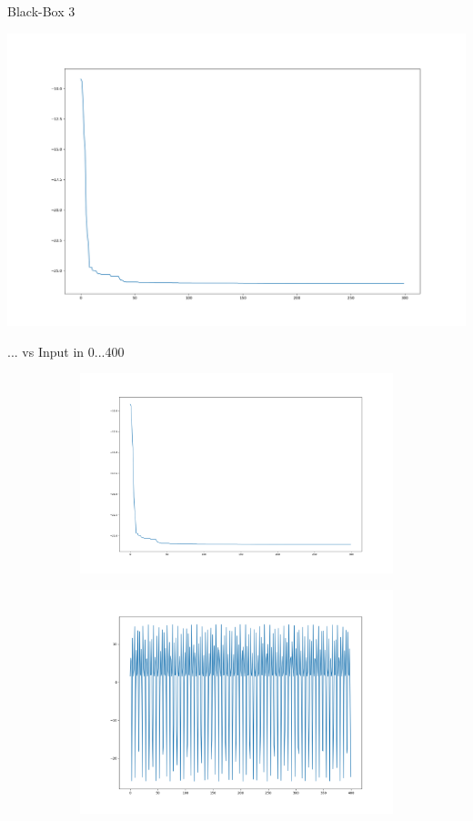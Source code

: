 \documentclass{ocbeameruni}
\begin{document}
\begin{frame}{Black-Box 3}
    \begin{center}
    \includegraphics[scale=0.25]{plots/bb3_2.png}
    \end{center}
\end{frame}


\begin{frame}{... vs Input in 0...400}
\begin{figure}
\centering
\begin{subfigure}
  \centering
  \includegraphics[width=.5\linewidth]{plots/bb3_2.png}
\end{subfigure}
\begin{subfigure}
  \centering
  \includegraphics[width=.5\linewidth]{plots/bb3_distr.png}
\end{subfigure}
\end{figure}
\end{frame}
\end{document}
